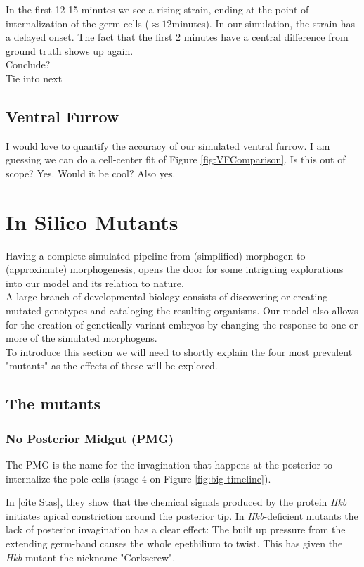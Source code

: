In the first 12-15-minutes we see a rising strain, ending at the point of internalization of the germ cells ($\approx12$minutes). In our simulation, the strain has a delayed onset. The fact that the first 2 minutes have a central difference from ground truth shows up again.\\

Conclude?\\

Tie into next\\


\subsection{Ventral Furrow}
I would love to quantify the accuracy of our simulated ventral furrow.
I am guessing we can do a cell-center fit of Figure \ref{fig:VFComparison}.
Is this out of scope? Yes. Would it be cool? Also yes.
\newpage
\section{In Silico Mutants}
Having a complete simulated pipeline from (simplified) morphogen to (approximate) morphogenesis, opens the door for some intriguing explorations into our model and its relation to nature.\\

A large branch of developmental biology consists of discovering or creating mutated genotypes and cataloging the resulting organisms. 
Our model also allows for the creation of genetically-variant embryos by changing the response to one or more of the simulated morphogens.\\

To introduce this section we will need to shortly explain the four most prevalent "mutants" as the effects of these will be explored. 

\subsection{The mutants}
\subsubsection{No Posterior Midgut (PMG)}
The PMG is the name for the invagination that happens at the posterior to internalize the pole cells (stage 4 on Figure \ref{fig:big-timeline}).

In [cite Stas], they show that the chemical signals produced by the protein \textit{Hkb} initiates apical constriction around the posterior tip. In \textit{Hkb}-deficient mutants the lack of posterior invagination has a clear effect: The built up pressure from the extending germ-band causes the whole epethilium to twist. This has given the \textit{Hkb}-mutant the nickname "Corkscrew".\\

